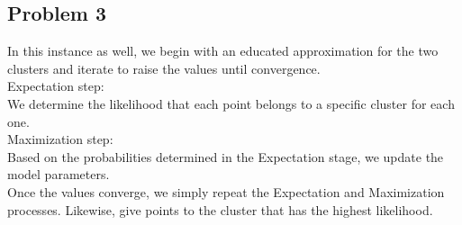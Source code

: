 \documentclass[letterpaper, 12 pt, conference]{IEEEtran}
\begin{document}
\subsection{Problem 3}
In this instance as well, we begin with an educated approximation for the two clusters and iterate to raise the values until convergence.\\
Expectation step:\\
We determine the likelihood that each point belongs to a specific cluster for each one.\\
Maximization step:\\
Based on the probabilities determined in the Expectation stage, we update the model parameters.\\
Once the values converge, we simply repeat the Expectation and Maximization processes. Likewise, give points to the cluster that has the highest likelihood.\\
\end{document}
